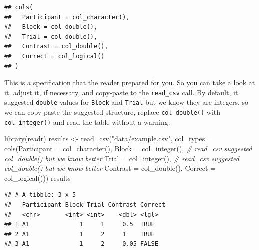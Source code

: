\documentclass[
]{book}
\newenvironment{Shaded}{\begin{snugshade}}{\end{snugshade}}
\newcommand{\AttributeTok}[1]{\textcolor[rgb]{0.77,0.63,0.00}{#1}}
\newcommand{\CommentTok}[1]{\textcolor[rgb]{0.56,0.35,0.01}{\textit{#1}}}
\newcommand{\FunctionTok}[1]{\textcolor[rgb]{0.00,0.00,0.00}{#1}}
\newcommand{\NormalTok}[1]{#1}
\newcommand{\OtherTok}[1]{\textcolor[rgb]{0.56,0.35,0.01}{#1}}
\newcommand{\StringTok}[1]{\textcolor[rgb]{0.31,0.60,0.02}{#1}}
\begin{document}
\begin{verbatim}
## cols(
##   Participant = col_character(),
##   Block = col_double(),
##   Trial = col_double(),
##   Contrast = col_double(),
##   Correct = col_logical()
## )
\end{verbatim}

This is a specification that the reader prepared for you. So you can take a look at it, adjust it, if necessary, and copy-paste to the \texttt{read\_csv} call. By default, it suggested \texttt{double} values for \texttt{Block} and \texttt{Trial} but we know they are integers, so we can copy-paste the suggested structure, replace \texttt{col\_double()} with \texttt{col\_integer()} and read the table without a warning.

\begin{Shaded}
\begin{Highlighting}[]
\FunctionTok{library}\NormalTok{(readr)}
\NormalTok{results }\OtherTok{\textless{}{-}} \FunctionTok{read\_csv}\NormalTok{(}\StringTok{"data/example.csv"}\NormalTok{, }
                    \AttributeTok{col\_types =} \FunctionTok{cols}\NormalTok{(}\AttributeTok{Participant =} \FunctionTok{col\_character}\NormalTok{(),}
                                     \AttributeTok{Block =} \FunctionTok{col\_integer}\NormalTok{(), }\CommentTok{\# read\_csv suggested col\_double() but we know better}
                                     \AttributeTok{Trial =} \FunctionTok{col\_integer}\NormalTok{(), }\CommentTok{\# read\_csv suggested col\_double() but we know better}
                                     \AttributeTok{Contrast =} \FunctionTok{col\_double}\NormalTok{(),}
                                     \AttributeTok{Correct =} \FunctionTok{col\_logical}\NormalTok{()))}
\NormalTok{results}
\end{Highlighting}
\end{Shaded}

\begin{verbatim}
## # A tibble: 3 x 5
##   Participant Block Trial Contrast Correct
##   <chr>       <int> <int>    <dbl> <lgl>  
## 1 A1              1     1     0.5  TRUE   
## 2 A1              1     2     1    TRUE   
## 3 A1              1     2     0.05 FALSE
\end{verbatim}
\end{document}
